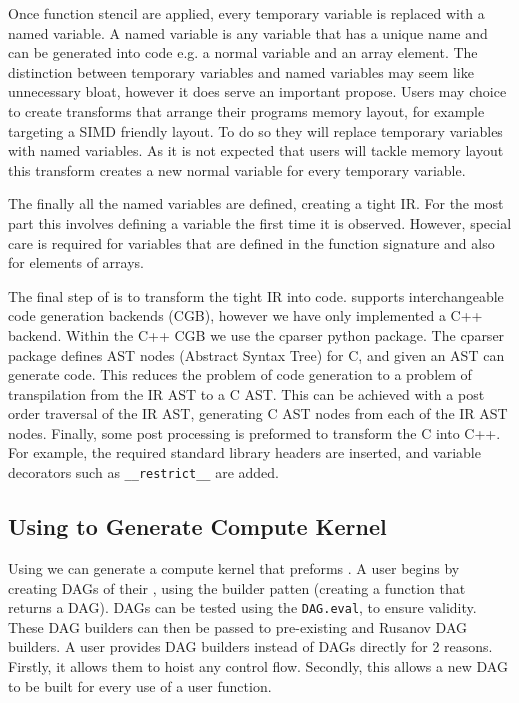 Once function stencil are applied, every temporary variable is replaced with a named variable.
A named variable is any variable that has a unique name and can be generated into code e.g. a normal variable and an array element.
The distinction between temporary variables and named variables may seem like unnecessary bloat, however it does serve an important propose.
Users may choice to create transforms that arrange their programs memory layout, for example targeting a SIMD friendly layout.
To do so they will replace temporary variables with named variables.
As it is not expected that users will tackle memory layout this transform creates a new normal variable for every temporary variable. 

The finally all the named variables are defined, creating a tight IR.
For the most part this involves defining a variable the first time it is observed.
However, special care is required for variables that are defined in the function signature and also for elements of arrays.

The final step of \phlat is to transform the tight IR into code.
\phlat supports interchangeable code generation backends (CGB), however we have only implemented a C++ backend.
Within the C++ CGB we use the cparser python package.
The cparser package defines AST nodes (Abstract Syntax Tree) for C, and given an AST can generate code.
This reduces the problem of code generation to a problem of transpilation from the IR AST to a C AST.
This can be achieved with a post order traversal of the IR AST, generating C AST nodes from each of the IR AST nodes.
Finally, some post processing is preformed to transform the C into C++.
For example, the required standard library headers are inserted, and variable decorators such as \lstinline{__restrict__} are added.  

\subsection{Using \phlat to Generate Compute Kernel}
Using \phlat we can generate a compute kernel that preforms .
A user begins by creating DAGs of their , using the builder patten (creating a function that returns a DAG).
DAGs can be tested using the \texttt{DAG.eval}, to ensure validity.
These DAG builders can then be passed to pre-existing  and Rusanov DAG builders.
A user provides DAG builders instead of DAGs directly for 2 reasons.
Firstly, it allows them to hoist any control flow.
Secondly, this allows a new DAG to be built for every use of a user function.

